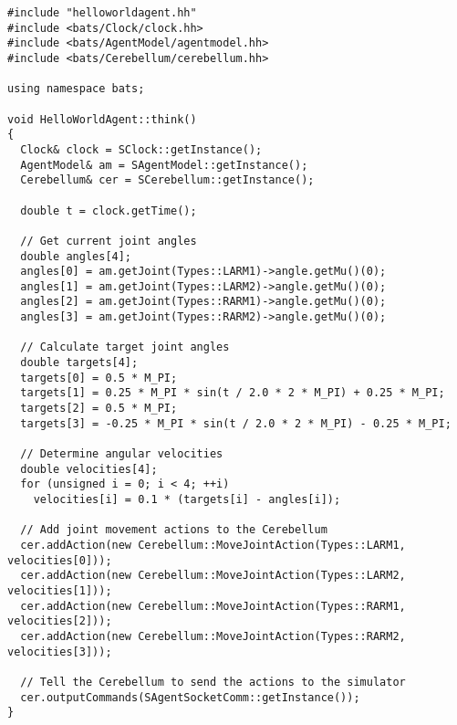 \begin{lstlisting}[float,caption={\tt myagent.cc},label=codeMyagentcc,frame=single]
#include "helloworldagent.hh"
#include <bats/Clock/clock.hh>
#include <bats/AgentModel/agentmodel.hh>
#include <bats/Cerebellum/cerebellum.hh>

using namespace bats;

void HelloWorldAgent::think()
{
  Clock& clock = SClock::getInstance();
  AgentModel& am = SAgentModel::getInstance();
  Cerebellum& cer = SCerebellum::getInstance();
  
  double t = clock.getTime();
  
  // Get current joint angles
  double angles[4];
  angles[0] = am.getJoint(Types::LARM1)->angle.getMu()(0);
  angles[1] = am.getJoint(Types::LARM2)->angle.getMu()(0);
  angles[2] = am.getJoint(Types::RARM1)->angle.getMu()(0);
  angles[3] = am.getJoint(Types::RARM2)->angle.getMu()(0);
  
  // Calculate target joint angles
  double targets[4];
  targets[0] = 0.5 * M_PI;
  targets[1] = 0.25 * M_PI * sin(t / 2.0 * 2 * M_PI) + 0.25 * M_PI;
  targets[2] = 0.5 * M_PI;
  targets[3] = -0.25 * M_PI * sin(t / 2.0 * 2 * M_PI) - 0.25 * M_PI;
  
  // Determine angular velocities
  double velocities[4];
  for (unsigned i = 0; i < 4; ++i)
    velocities[i] = 0.1 * (targets[i] - angles[i]);
  
  // Add joint movement actions to the Cerebellum
  cer.addAction(new Cerebellum::MoveJointAction(Types::LARM1, velocities[0]));
  cer.addAction(new Cerebellum::MoveJointAction(Types::LARM2, velocities[1]));
  cer.addAction(new Cerebellum::MoveJointAction(Types::RARM1, velocities[2]));
  cer.addAction(new Cerebellum::MoveJointAction(Types::RARM2, velocities[3]));
  
  // Tell the Cerebellum to send the actions to the simulator
  cer.outputCommands(SAgentSocketComm::getInstance());
}
\end{lstlisting}

